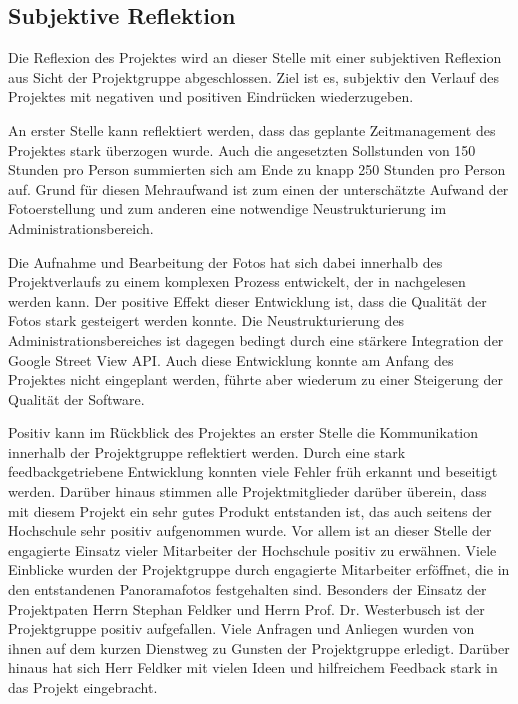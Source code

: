 \subsection{Subjektive Reflektion}
\label{sec:SubjektiveReflekion}

Die Reflexion des Projektes wird an dieser Stelle mit 
einer subjektiven Reflexion aus Sicht der Projektgruppe abgeschlossen. Ziel ist
es, subjektiv den Verlauf des Projektes mit negativen und positiven Eindrücken
wiederzugeben.

An erster Stelle kann reflektiert werden, dass das geplante Zeitmanagement
des Projektes stark überzogen wurde. Auch die angesetzten Sollstunden von
150 Stunden pro Person summierten sich am Ende zu knapp 250 Stunden pro Person auf.
Grund für diesen Mehraufwand ist zum einen der unterschätzte Aufwand der 
Fotoerstellung und zum anderen eine notwendige Neustrukturierung im 
Administrationsbereich.

Die Aufnahme und Bearbeitung der Fotos hat sich dabei innerhalb des
Projektverlaufs zu einem komplexen Prozess entwickelt, der in
\citet{modelierungUndBetrieb2014} nachgelesen werden kann. Der
positive Effekt dieser Entwicklung ist, dass die
Qualität der Fotos stark gesteigert werden konnte.
Die Neustrukturierung des Administrationsbereiches ist dagegen bedingt durch eine stärkere
Integration der Google Street View API. Auch diese Entwicklung konnte am Anfang des Projektes
nicht eingeplant werden, führte aber wiederum zu einer Steigerung der Qualität der Software.

Positiv kann im Rückblick des Projektes an erster Stelle die Kommunikation
innerhalb der Projektgruppe reflektiert werden. Durch eine stark feedbackgetriebene
Entwicklung konnten viele Fehler früh erkannt und beseitigt werden.
Darüber hinaus stimmen alle Projektmitglieder darüber überein, dass mit diesem
Projekt ein sehr gutes Produkt entstanden ist, das auch seitens der Hochschule
sehr positiv aufgenommen wurde. Vor allem ist an dieser Stelle der engagierte Einsatz
vieler Mitarbeiter der Hochschule positiv zu erwähnen. Viele Einblicke wurden der
Projektgruppe durch engagierte Mitarbeiter erföffnet, die in den entstandenen Panoramafotos festgehalten sind.
Besonders der Einsatz der Projektpaten Herrn Stephan Feldker und Herrn Prof. Dr. Westerbusch 
ist der Projektgruppe positiv aufgefallen.
Viele Anfragen und Anliegen wurden von ihnen auf dem kurzen Dienstweg zu Gunsten der Projektgruppe
erledigt. Darüber hinaus hat sich Herr Feldker mit vielen Ideen und hilfreichem Feedback stark in das Projekt
eingebracht.